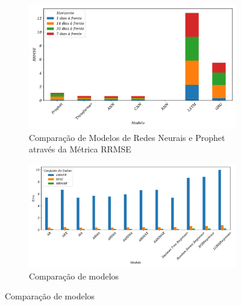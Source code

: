 \begin{figure}[H]
	\centering
	\caption{Análise Comparativa dos Modelos Utilizando Gráfico de Barras}
	\begin{subfigure}{0.8\textwidth}
		\includegraphics[width=\linewidth]{Resultados/Figuras/rrmse_comparar}
		\caption{Comparação de Modelos de Redes Neurais e Prophet através da Métrica RRMSE}
		\label{fig:rrmse_comparar}
	\end{subfigure}
	
	\begin{subfigure}{0.8\textwidth}
		\includegraphics[width=\linewidth]{Resultados/Figuras/basic_comparar}
		\caption{Comparação de modelos}
		\label{fig:basic_comparar}
	\end{subfigure}
	
\end{figure}

